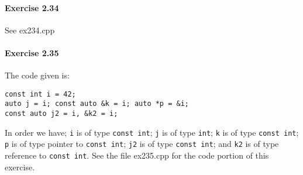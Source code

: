 \paragraph{Exercise 2.34}
See ex234.cpp

\paragraph{Exercise 2.35}
The code given is:
\begin{flushleft}
		\texttt{const int i = 42;}\\
		\texttt{auto j = i; const auto \&k = i; auto *p = \&i;}\\
		\texttt{const auto j2 = i, \&k2 = i;}
\end{flushleft}
In order we have; \texttt{i} is of type \texttt{const int}; \texttt{j} is of type \texttt{int}; \texttt{k} is of type \texttt{const int}; \texttt{p} is of type pointer to \texttt{const int}; \texttt{j2} is of type \texttt{const int}; and \texttt{k2} is of type reference to \texttt{const int}. See the file ex235.cpp for the code portion of this exercise.
